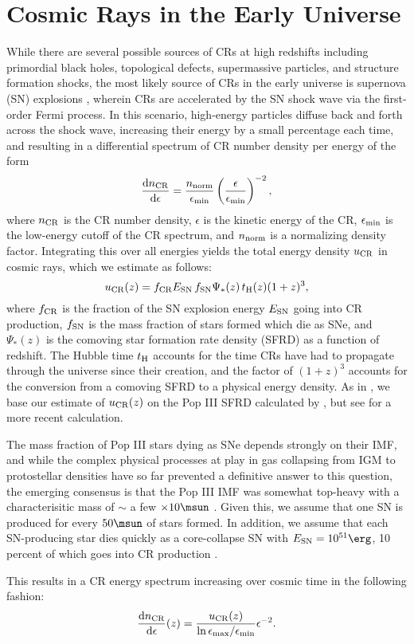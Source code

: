 \section{Cosmic Rays in the Early Universe}
\label{sec:context}
While there are several possible sources of CRs at high redshifts including primordial black holes, topological defects, supermassive particles, and structure formation shocks, the most likely source of CRs in the early universe is supernova (SN) explosions \citep[e.g.,][]{GinzburgSyrovatskii1969,BiermannSigl2001,Stanev2004,Pfrommeretal2006}, wherein CRs are accelerated by the SN shock wave via the first-order Fermi process.  In this scenario, high-energy particles diffuse back and forth across the shock wave, increasing their energy by a small percentage each time, and resulting in a differential spectrum of CR number density per energy \citep{Longair1994} of the form
\begin{equation}
    \frac{{\rm d}n_{\rm \small CR}}{{\rm d}\epsilon} = \frac{n_{\rm norm}}{\epsilon_{\rm min}}
    \left( \frac{\epsilon}{\epsilon_{\rm min}} \right)^{-2},
\end{equation}
where $n_{\rm \small CR}$ is the CR number density, $\epsilon$ is the kinetic energy of the CR, $\epsilon_{\rm min}$ is the low-energy cutoff of the CR spectrum, and $n_{\rm norm}$ is a normalizing density factor. Integrating this over all energies yields the total energy density $u_{\rm \small CR}$ in cosmic rays, which we estimate as follows:
\begin{equation}
u_{\rm \small CR}(z) = f_{\rm \small CR} E_{\rm \small SN}\, f_{\rm \small SN} \Psi_{*}(z)\, t_{\rm \small H}(z) (1+z)^3,
\end{equation}
where $f_{\rm \small CR}$ is the fraction of the SN explosion energy $E_{\rm \small SN}$ going into CR production, $f_{\rm \small SN}$ is the mass fraction of stars formed which die as SNe, and $\Psi_{*}(z)$ is the comoving star formation rate density (SFRD) as a function of redshift.  The Hubble time $t_{\rm \small H}$ accounts for the time CRs have had to propagate through the universe since their creation, and the factor of $(1+z)^3$ accounts for the conversion from a comoving SFRD to a physical energy density. As in \citet{Hummeletal2015}, we base our estimate of $u_{\rm \small CR}(z)$ on the Pop III SFRD calculated by \citet{GreifBromm2006}, but see \citet{Campisietal2011} for a more recent calculation.

 The mass fraction of Pop III stars dying as SNe depends strongly on their IMF, and while the complex physical processes at play in gas collapsing from IGM to protostellar densities have so far prevented a definitive answer to this question, the emerging consensus is that the Pop III IMF was somewhat top-heavy with a characterisitic mass of $\sim$ a few $\times 10\msun$ \citep{Bromm2013}.  Given this, we assume that one SN is produced for every $50\msun$ of stars formed.  In addition, we assume that each SN-producing star dies quickly as a core-collapse SN with $E_{\rm \small SN} = 10^{51}\erg$, 10 percent of which goes into CR production \citep[e.g.,][]{Ruderman1974}.
 
 This results in a CR energy spectrum increasing over cosmic time in the following fashion:
 \begin{equation}
 \frac{{\rm d}n_{\rm \small CR}}{{\rm d}\epsilon}(z) = \frac{u_{\rm \small CR}(z)}{{\rm ln}\,\epsilon_{\rm max}{\large /}\epsilon_{\rm min}}  \epsilon^{-2}.
 \end{equation}